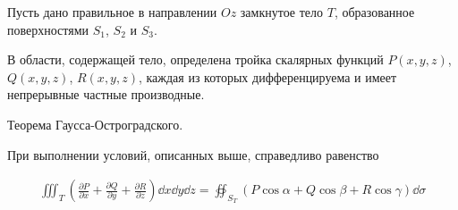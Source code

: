 
\begin{multicols}{2}
  
  \columnbreak

  Пусть дано правильное в направлении \(Oz\) замкнутое тело \(T\), образованное
  поверхностями \(S_{1}\), \(S_{2}\) и \(S_{3}\).

  В области, содержащей тело, определена тройка скалярных функций
  \(P(x, y, z)\), \(Q(x, y, z)\), \(R(x, y, z)\), каждая из которых
  дифференцируема и имеет непрерывные частные производные.
\end{multicols}
  
\begin{theorem}\label{GO}
  Теорема Гаусса-Остроградского.

  При выполнении условий, описанных выше, справедливо равенство
  
  \begin{align*}
    \iiint_{T} \left(
      \frac{\partial P}{\partial x} +
      \frac{\partial Q}{\partial y} +
      \frac{\partial R}{\partial z}
    \right) \dd x \dd y \dd z
    =
    \oiint_{S_{T}} \left(
      P \cos \alpha +
      Q \cos \beta +
      R \cos \gamma
    \right) \dd \sigma
  \end{align*}
\end{theorem}  
